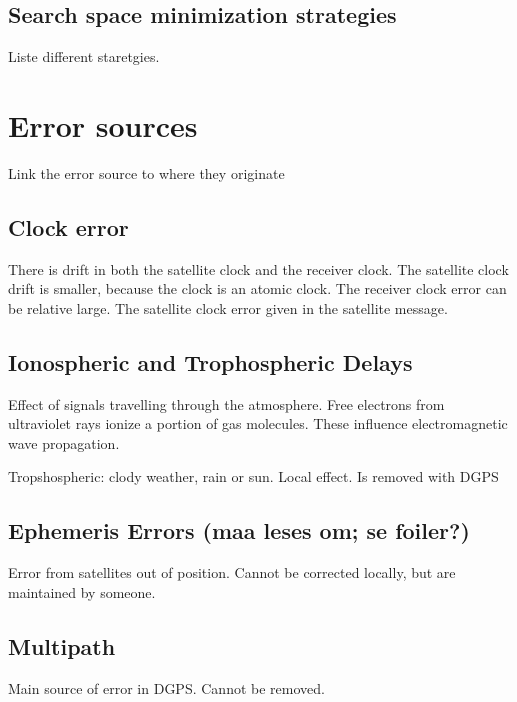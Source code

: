 \subsection{Search space minimization strategies}
Liste different staretgies.
\section{Error sources}
Link the error source to where they originate
\subsection{Clock error}
There is drift in both the satellite clock and the receiver clock. The satellite clock drift is smaller, because the clock is an atomic clock. The receiver clock error can be relative large. The satellite clock error given in the satellite message. 
\subsection{Ionospheric and Trophospheric Delays}
Effect of signals travelling through the atmosphere. Free electrons from ultraviolet rays ionize a portion of gas molecules. These influence electromagnetic wave propagation.

Tropshospheric: clody weather, rain or sun. Local effect. Is removed with DGPS
\subsection{Ephemeris Errors (maa leses om; se foiler?)}
Error from satellites out of position. Cannot be corrected locally, but are maintained by someone.
\subsection{Multipath}
Main source of error in DGPS. Cannot be removed. 
\cleardoublepage